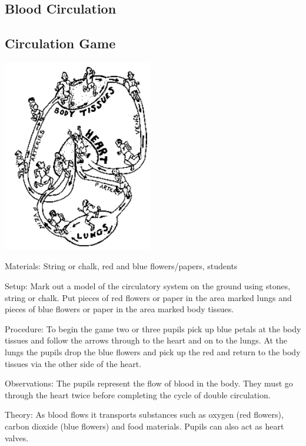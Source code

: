 \begin{multicols}{2}
\columnbreak


\section*{Blood Circulation}


\subsection{Circulation Game} %
\label{sub:circulation-game}

\begin{center}
\includegraphics[width=0.49\textwidth]{./img/source/circulation-game.png}
\end{center}

\begin{description*}
\item[Materials:]{String or chalk, red and blue flowers/papers, students}
\item[Setup:]{Mark out a model of the circulatory system on the ground using stones, string or chalk. Put
pieces of red flowers or paper in the area marked lungs and pieces of blue flowers or paper in
the area marked body tissues. }
\item[Procedure:]{To begin the game two or three pupils pick up blue petals at
the body tissues and follow the arrows through to the heart and on to the lungs. At the lungs
the pupils drop the blue flowers and pick up the red and return to the body tissues via the
other side of the heart.}
\item[Observations:]{The pupils represent the flow of blood in the body. They must go through the heart twice
before completing the cycle of double circulation. }
\item[Theory:]{As blood flows it transports substances
such as oxygen (red flowers), carbon dioxide (blue flowers) and food materials. Pupils can
also act as heart valves.}
\end{description*}


\end{multicols}
